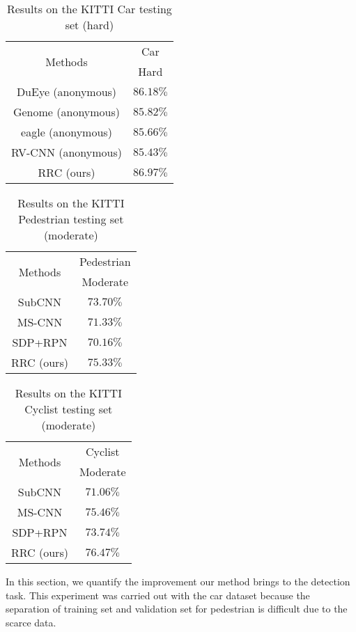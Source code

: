 \documentclass[10pt,twocolumn,letterpaper]{article}
\begin{document}
\begin{table}
\centering
\caption{Results on the KITTI Car testing set (hard)}
\label{table:final_compare2}
\begin{tabular}{|c||c|}
\hline
\hline
\multirow{2}{*}{Methods} & \multicolumn{1}{c|}{Car}\\
 &Hard\\
\hline
DuEye (anonymous)&$86.18\%$\\
Genome (anonymous)&$85.82\%$\\
eagle (anonymous)&$85.66\%$\\
RV-CNN (anonymous)&$85.43\%$\\
\hline
RRC (ours)&$86.97\%$\\
\hline
\end{tabular}
\end{table}

\begin{table}
\centering
\caption{Results on the KITTI Pedestrian testing set (moderate)}
\label{table:final_compare3}
\begin{tabular}{|c||c|}
\hline
\hline
\multirow{2}{*}{Methods} & \multicolumn{1}{c|}{Pedestrian}  \\
 &Moderate\\
\hline
SubCNN \cite{Xiang16}&$73.70\%$\\
MS-CNN \cite{Cai16}&$71.33\%$\\
SDP+RPN \cite{Yang16}&$70.16\%$\\
\hline
RRC (ours)&$75.33\%$\\
\hline
\end{tabular}
\end{table}

\begin{table}
\centering
\caption{Results on the KITTI Cyclist testing set (moderate)}
\label{table:final_compare4}
\begin{tabular}{|c||c|}
\hline
\hline
\multirow{2}{*}{Methods} & \multicolumn{1}{c|}{Cyclist}  \\
 &Moderate\\
\hline
SubCNN \cite{Xiang16}&$71.06\%$\\
MS-CNN \cite{Cai16}&$75.46\%$\\
SDP+RPN \cite{Yang16}&$73.74\%$\\
\hline
RRC (ours)&$76.47\%$\\
\hline
\end{tabular}
\end{table}

In this section, we quantify the improvement our method brings to the detection task. This experiment was carried out with the car dataset because the separation of training set and validation set for pedestrian is difficult due to the scarce data.
\end{document}

